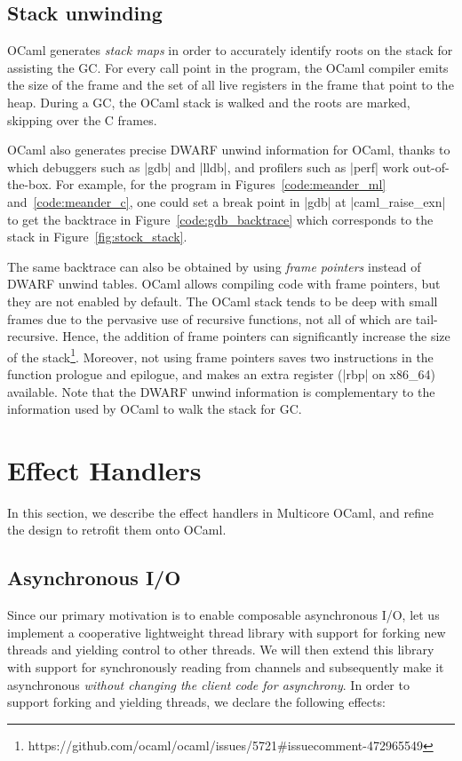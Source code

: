 \documentclass[sigplan,screen]{acmart}
\begin{document}
\subsection{Stack unwinding}
\label{sec:unwind}

OCaml generates \emph{stack maps} in order to accurately identify roots on the
stack for assisting the GC. For every call point in the program, the OCaml
compiler emits the size of the frame and the set of all live registers in the
frame that point to the heap. During a GC, the OCaml stack is walked and the
roots are marked, skipping over the C frames.

OCaml also generates precise DWARF unwind information for OCaml, thanks to
which debuggers such as |gdb| and |lldb|, and profilers such as |perf| work
out-of-the-box. For example, for the program in Figures~\ref{code:meander_ml}
and~\ref{code:meander_c}, one could set a break point in |gdb| at
|caml_raise_exn| to get the backtrace in Figure~\ref{code:gdb_backtrace} which
corresponds to the stack in Figure~\ref{fig:stock_stack}.

The same backtrace can also be obtained by using \emph{frame pointers} instead
of DWARF unwind tables. OCaml allows compiling code with frame pointers, but
they are not enabled by default. The OCaml stack tends to be deep with small
frames due to the pervasive use of recursive functions, not all of which are
tail-recursive. Hence, the addition of frame pointers can significantly
increase the size of the
stack\footnote{https://github.com/ocaml/ocaml/issues/5721\#issuecomment-472965549}.
Moreover, not using frame pointers saves two instructions in the function
prologue and epilogue, and makes an extra register (|rbp| on x86\_64)
available. Note that the DWARF unwind information is complementary to the
information used by OCaml to walk the stack for GC.

\section{Effect Handlers}
\label{sec:refine}

In this section, we describe the effect handlers in Multicore OCaml, and refine
the design to retrofit them onto OCaml.

\subsection{Asynchronous I/O}

Since our primary motivation is to enable composable asynchronous I/O, let us
implement a cooperative lightweight thread library with support for forking new
threads and yielding control to other threads. We will then extend this library
with support for synchronously reading from channels and subsequently make it
asynchronous \textit{without changing the client code for asynchrony}. In order
to support forking and yielding threads, we declare the following effects:
\end{document}
